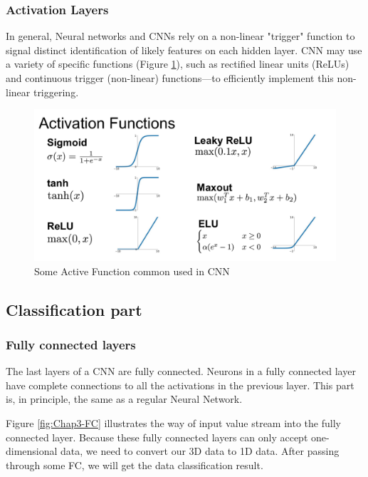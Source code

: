
\subsubsection{Activation Layers}

In general, Neural networks and CNNs rely on a non-linear "trigger" function to signal distinct identification of likely features on each hidden layer. CNN may use a variety of specific functions (Figure \ref{fig:Chap3-CNN_ActiveFunction}), such as rectified linear units (ReLUs) and continuous trigger (non-linear) functions—to efficiently implement this non-linear triggering.

\begin{figure}[H]
	\centering
	\includegraphics[width=\textwidth]{img/Chap3/ActiveFunction}
	\caption{ Some Active Function common used in CNN }
	\label{fig:Chap3-CNN_ActiveFunction}
\end{figure}
\subsection{Classification part}
\subsubsection{Fully connected layers}

The last layers of a CNN are fully connected. Neurons in a fully connected layer have complete connections to all the activations in the previous layer. This part is, in principle, the same as a regular Neural Network.

Figure \ref{fig:Chap3-FC} illustrates the way of input value stream into the fully connected layer. Because these fully connected layers can only accept one-dimensional data, we need to convert our 3D data to 1D data. After passing through some FC, we will get the data classification result.

